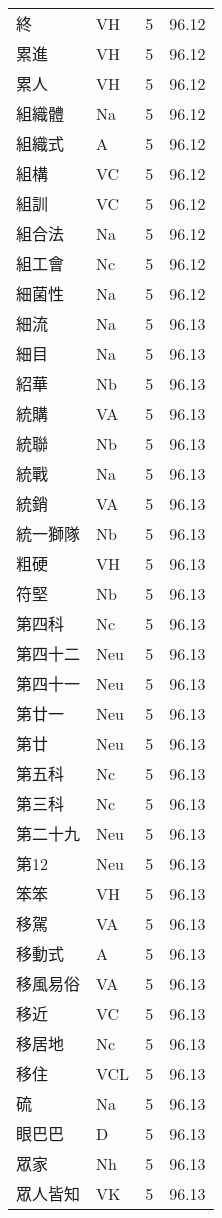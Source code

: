 \documentclass[twocolumn]{book}
\begin{document}
\begin{supertabular}{llrr}
終 & VH & 5 &  96.12\\
累進 & VH & 5 &  96.12\\
累人 & VH & 5 &  96.12\\
組織體 & Na & 5 &  96.12\\
組織式 & A & 5 &  96.12\\
組構 & VC & 5 &  96.12\\
組訓 & VC & 5 &  96.12\\
組合法 & Na & 5 &  96.12\\
組工會 & Nc & 5 &  96.12\\
細菌性 & Na & 5 &  96.12\\
細流 & Na & 5 &  96.13\\
細目 & Na & 5 &  96.13\\
紹華 & Nb & 5 &  96.13\\
統購 & VA & 5 &  96.13\\
統聯 & Nb & 5 &  96.13\\
統戰 & Na & 5 &  96.13\\
統銷 & VA & 5 &  96.13\\
統一獅隊 & Nb & 5 &  96.13\\
粗硬 & VH & 5 &  96.13\\
符堅 & Nb & 5 &  96.13\\
第四科 & Nc & 5 &  96.13\\
第四十二 & Neu & 5 &  96.13\\
第四十一 & Neu & 5 &  96.13\\
第廿一 & Neu & 5 &  96.13\\
第廿 & Neu & 5 &  96.13\\
第五科 & Nc & 5 &  96.13\\
第三科 & Nc & 5 &  96.13\\
第二十九 & Neu & 5 &  96.13\\
第12 & Neu & 5 &  96.13\\
笨笨 & VH & 5 &  96.13\\
移駕 & VA & 5 &  96.13\\
移動式 & A & 5 &  96.13\\
移風易俗 & VA & 5 &  96.13\\
移近 & VC & 5 &  96.13\\
移居地 & Nc & 5 &  96.13\\
移住 & VCL & 5 &  96.13\\
硫 & Na & 5 &  96.13\\
眼巴巴 & D & 5 &  96.13\\
眾家 & Nh & 5 &  96.13\\
眾人皆知 & VK & 5 &  96.13\\

\end{supertabular}
\end{document}
